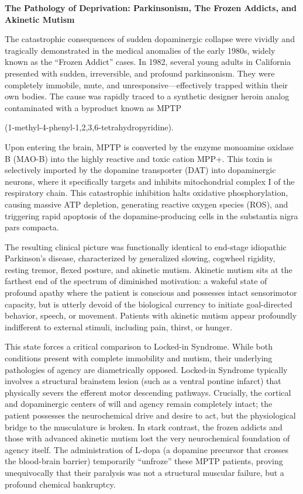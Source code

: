 \textbf{The Pathology of Deprivation: Parkinsonism, The Frozen Addicts, and Akinetic Mutism}

The catastrophic consequences of sudden dopaminergic collapse were vividly and tragically demonstrated in the medical anomalies of the early 1980s, widely known as the ``Frozen Addict'' cases. In 1982, several young adults in California presented with sudden, irreversible, and profound parkinsonism. They were completely immobile, mute, and unresponsive---effectively trapped within their own bodies. The cause was rapidly traced to a synthetic designer heroin analog contaminated with a byproduct known as MPTP

(1-methyl-4-phenyl-1,2,3,6-tetrahydropyridine).

Upon entering the brain, MPTP is converted by the enzyme monoamine oxidase B (MAO-B) into the highly reactive and toxic cation MPP+. This toxin is selectively imported by the dopamine transporter (DAT) into dopaminergic neurons, where it specifically targets and inhibits mitochondrial complex I of the respiratory chain. This catastrophic inhibition halts oxidative phosphorylation, causing massive ATP depletion, generating reactive oxygen species (ROS), and triggering rapid apoptosis of the dopamine-producing cells in the substantia nigra pars compacta.

The resulting clinical picture was functionally identical to end-stage idiopathic Parkinson's disease, characterized by generalized slowing, cogwheel rigidity, resting tremor, flexed posture, and akinetic mutism. Akinetic mutism sits at the farthest end of the spectrum of diminished motivation: a wakeful state of profound apathy where the patient is conscious and possesses intact sensorimotor capacity, but is utterly devoid of the biological currency to initiate goal-directed behavior, speech, or movement. Patients with akinetic mutism appear profoundly indifferent to external stimuli, including pain, thirst, or hunger.

This state forces a critical comparison to Locked-in Syndrome. While both conditions present with complete immobility and mutism, their underlying pathologies of agency are diametrically opposed. Locked-in Syndrome typically involves a structural brainstem lesion (such as a ventral pontine infarct) that physically severs the efferent motor descending pathways. Crucially, the cortical and dopaminergic centers of will and agency remain completely intact; the patient possesses the neurochemical drive and desire to act, but the physiological bridge to the musculature is broken. In stark contrast, the frozen addicts and those with advanced akinetic mutism lost the very neurochemical foundation of agency itself. The administration of L-dopa (a dopamine precursor that crosses the blood-brain barrier) temporarily ``unfroze'' these MPTP patients, proving unequivocally that their paralysis was not a structural muscular failure, but a profound chemical bankruptcy.

